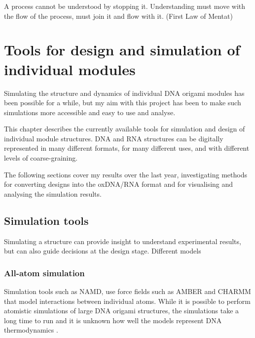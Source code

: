 \begin{savequote}[8cm]
A process cannot be understood by stopping it. Understanding must move with the flow of the process, must join it and flow with it. (First Law of Mentat)
\end{savequote}

\chapter{Tools for design and simulation of individual modules}\label{sec:toolsForIndMod}

\minitoc


Simulating the structure and dynamics of individual DNA origami modules has been possible for a while, but my aim with this project has been to make such simulations more accessible and easy to use and analyse.


This chapter describes the currently available tools for simulation and design of individual module structures. DNA and RNA structures can be digitally represented in many different formats, for many different uses, and with different levels of coarse-graining. 

The following sections cover my results over the last year, investigating methods for converting designs into the oxDNA/RNA format and for visualising and analysing the simulation results.

\section{Simulation tools}
Simulating a structure can provide insight to understand experimental results, but can also guide decisions at the design stage. Different models

\subsection{All-atom simulation}
Simulation tools such as NAMD\cite{NAMDphillips2005scalable}, use force fields such as AMBER\cite{AMBERcornell1996second} and CHARMM \cite{brooks1983charmm} that model interactions between individual atoms. While it is possible to perform atomistic simulations of large DNA origami structures\cite{yoo2013situ}, the simulations take a long time to run and it is unknown how well the models represent DNA thermodynamics \cite{sengar2021primer}.

